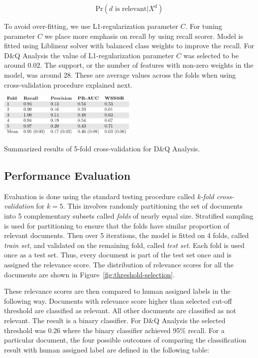 \documentclass[10pt,twocolumn,letterpaper]{article}
\begin{document}
$$
\text{Pr}(\text{$d$ is relevant} | X^{d})
$$

To avoid over-fitting, we use L1-regularization parameter $C$. For tuning parameter $C$ we place more emphasis on recall by using recall scorer. Model is fitted using Liblinear solver with balanced class weights to improve the recall. For D\&Q Analysis the value of L1-regularization parameter $C$ was selected to be around $0.02$. The support, or the number of features with non-zero weights in the model, was around 28. These are average values across the folds when using cross-validation procedure explained next.

\begin{table}[ht]
\centering
\includegraphics[width=0.5\textwidth]{../tables/evaluation-results/evaluation-results-crop.pdf}
\caption{Summarized results of 5-fold cross-validation for D\&Q Analysis.}
\label{tab:eval-results}
\end{table}

\subsection{Performance Evaluation} \label{sec:evaluation}

Evaluation is done using the standard testing procedure called {\it k-fold cross-validation} for $k=5$. This involves randomly partitioning the set of documents into 5 complementary subsets called {\it folds} of nearly equal size. Stratified sampling is used for partitioning to ensure that the folds have similar proportion of relevant documents. Then over 5 iterations, the model is fitted on 4 folds, called {\it train set}, and validated on the remaining fold, called {\it test set}. Each fold is used once as a test set. Thus, every document is part of the test set once and is assigned the relevance score. The distribution of relevance scores for all the documents are shown in Figure~\ref{fig:threshold-selection}.

These relevance scores are then compared to human assigned labels in the following way. Documents with relevance score higher than selected cut-off threshold are classified as relevant. All other documents are classified as not relevant. The result is a binary classifier. For D\&Q Analysis the selected threshold was 0.26 where the binary classifier achieved 95\% recall. For a particular document, the four possible outcomes of comparing the classification result with human assigned label are defined in the following table:
\end{document}
